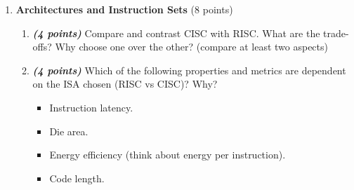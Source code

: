 \documentclass[a4paper,10pt]{article}
\begin{document}
\begin{enumerate}
\begin{enumerate}
\end{enumerate}

\vspace{\baselineskip}

\begin{comment}
    QUESTION 5
\end{comment}

\item \textbf{Architectures and Instruction Sets} (8 points)

\begin{enumerate}
    \item \textbf{\textit{(4 points)}} Compare and contrast CISC with RISC. What are the trade-offs? Why choose one over the other? (compare at least two aspects)

    \item \textbf{\textit{(4 points)}} Which of the following properties and metrics are dependent on the ISA chosen (RISC vs CISC)? Why?

    \begin{itemize}
        \item Instruction latency.
        \item Die area.
        \item Energy efficiency (think about energy per instruction).
        \item Code length.
    \end{itemize}

\end{enumerate}

\end{enumerate}

\end{document}
